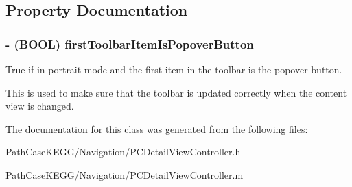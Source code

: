 \subsection{Property Documentation}
\hypertarget{interface_p_c_detail_view_controller_ae889b05b8bc880ad0b5f4bb393bececc}{
\subsubsection[{firstToolbarItemIsPopoverButton}]{\setlength{\rightskip}{0pt plus 5cm}-\/ (BOOL) firstToolbarItemIsPopoverButton}}
\label{interface_p_c_detail_view_controller_ae889b05b8bc880ad0b5f4bb393bececc}


True if in portrait mode and the first item in the toolbar is the popover button. 

This is used to make sure that the toolbar is updated correctly when the content view is changed. 

The documentation for this class was generated from the following files:\begin{DoxyCompactItemize}
\item 
PathCaseKEGG/Navigation/PCDetailViewController.h\item 
PathCaseKEGG/Navigation/PCDetailViewController.m\end{DoxyCompactItemize}

